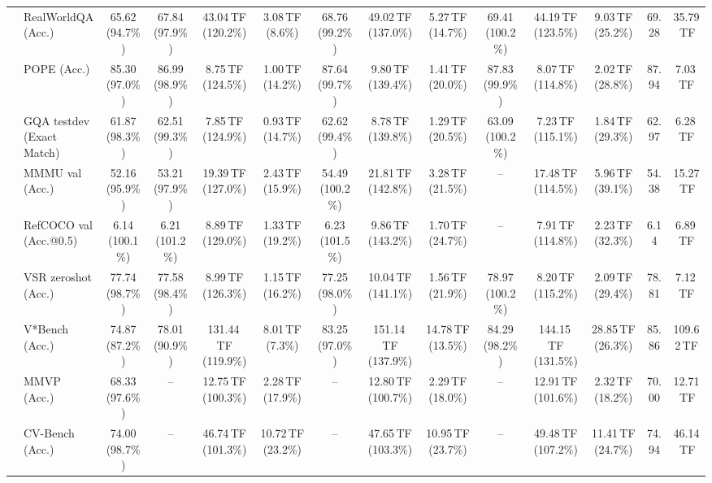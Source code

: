 \begin{table}[t]
\begin{center}
\begin{small}
\begin{sc}
{\begin{tabular}{llcccccccccccc}
& RealWorldQA (Acc.) & 65.62 (94.7\%) & 67.84 (97.9\%) & 43.04\,TF (120.2\%) & 3.08\,TF (8.6\%) & 68.76 (99.2\%) & 49.02\,TF (137.0\%) & 5.27\,TF (14.7\%) & 69.41 (100.2\%) & 44.19\,TF (123.5\%) & 9.03\,TF (25.2\%) & 69.28 & 35.79\,TF \\
& POPE (Acc.) & 85.30 (97.0\%) & 86.99 (98.9\%) & 8.75\,TF (124.5\%) & 1.00\,TF (14.2\%) & 87.64 (99.7\%) & 9.80\,TF (139.4\%) & 1.41\,TF (20.0\%) & 87.83 (99.9\%) & 8.07\,TF (114.8\%) & 2.02\,TF (28.8\%) & 87.94 & 7.03\,TF \\
& GQA testdev (Exact Match) & 61.87 (98.3\%) & 62.51 (99.3\%) & 7.85\,TF (124.9\%) & 0.93\,TF (14.7\%) & 62.62 (99.4\%) & 8.78\,TF (139.8\%) & 1.29\,TF (20.5\%) & 63.09 (100.2\%) & 7.23\,TF (115.1\%) & 1.84\,TF (29.3\%) & 62.97 & 6.28\,TF \\
& MMMU val (Acc.) & 52.16 (95.9\%) & 53.21 (97.9\%) & 19.39\,TF (127.0\%) & 2.43\,TF (15.9\%) & 54.49 (100.2\%) & 21.81\,TF (142.8\%) & 3.28\,TF (21.5\%) & -- & 17.48\,TF (114.5\%) & 5.96\,TF (39.1\%) & 54.38 & 15.27\,TF \\
& RefCOCO val (Acc.@0.5) & 6.14 (100.1\%) & 6.21 (101.2\%) & 8.89\,TF (129.0\%) & 1.33\,TF (19.2\%) & 6.23 (101.5\%) & 9.86\,TF (143.2\%) & 1.70\,TF (24.7\%) & -- & 7.91\,TF (114.8\%) & 2.23\,TF (32.3\%) & 6.14 & 6.89\,TF \\
& VSR zeroshot (Acc.) & 77.74 (98.7\%) & 77.58 (98.4\%) & 8.99\,TF (126.3\%) & 1.15\,TF (16.2\%) & 77.25 (98.0\%) & 10.04\,TF (141.1\%) & 1.56\,TF (21.9\%) & 78.97 (100.2\%) & 8.20\,TF (115.2\%) & 2.09\,TF (29.4\%) & 78.81 & 7.12\,TF \\
& V*Bench (Acc.) & 74.87 (87.2\%) & 78.01 (90.9\%) & 131.44\,TF (119.9\%) & 8.01\,TF (7.3\%) & 83.25 (97.0\%) & 151.14\,TF (137.9\%) & 14.78\,TF (13.5\%) & 84.29 (98.2\%) & 144.15\,TF (131.5\%) & 28.85\,TF (26.3\%) & 85.86 & 109.62\,TF \\
\midrule
{}
& MMVP (Acc.) & 68.33 (97.6\%) & -- & 12.75\,TF (100.3\%) & 2.28\,TF (17.9\%) & -- & 12.80\,TF (100.7\%) & 2.29\,TF (18.0\%) & -- & 12.91\,TF (101.6\%) & 2.32\,TF (18.2\%) & 70.00 & 12.71\,TF \\
& CV-Bench (Acc.) & 74.00 (98.7\%) & -- & 46.74\,TF (101.3\%) & 10.72\,TF (23.2\%) & -- & 47.65\,TF (103.3\%) & 10.95\,TF (23.7\%) & -- & 49.48\,TF (107.2\%) & 11.41\,TF (24.7\%) & 74.94 & 46.14\,TF \\

\end{tabular}}
\end{sc}
\end{small}
\end{center}
\end{table}
